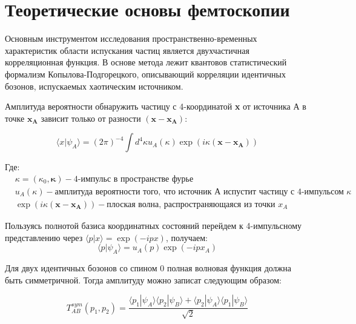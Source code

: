 \documentclass{extarticle}
\begin{document}
\section{Теоретические основы фемтоскопии}
    Основным инструментом исследования пространственно-временных характеристик 
    области испускания частиц является двухчастичная корреляционная функция. 
    В основе метода лежит квантовов статистический формализм Копылова-Подгорецкого, 
    описывающий корреляции идентичных бозонов, испускаемых хаотическим источником.

    Амплитуда вероятности обнаружить частицу с 4-координатой \textbf{x} от источника А 
    в точке $\mathbf{x_{A}}$ зависит только от разности $(\mathbf{x} - \mathbf{x_{A}})$:

    \begin{equation}
        \langle x|\psi_{A}\rangle =
            {(2\pi)}^{-4}
            \int 
                d^4\kappa u_{A}(\kappa) 
                \exp(i\kappa(\mathbf{x} - \mathbf{x_{A}})) 
    \end{equation}

    Где:
    \begin{align*}
        &\kappa = (\kappa_0, \mathbf{\kappa}) 
            - \text{4-импульс в пространстве фурье} \\
        &u_{A}(\kappa) 
            - \text{амплитуда вероятности того, что источник А испустит частицу с 4-импульсом }\kappa \\
        &\exp(i\kappa(\mathbf{x} - \mathbf{x_{A}})) 
            - \text{плоская волна, распространяющаяся из точки } x_A
    \end{align*}

    Пользуясь полнотой базиса координатных состояний перейдем 
    к 4-импульсному представлению через $\langle p|x\rangle = \exp(-ipx)$, получаем:
    \begin{equation}
        \langle p | \psi_{A}\rangle = 
            u_{A}(p) \exp(-ipx_{A})
    \end{equation}

    Для двух идентичных бозонов со спином 0 
    полная волновая функция должна быть симметричной. 
    Тогда амплитуду можно записат следующим образом:

    \begin{equation}
        T^{sym}_{AB} (p_{1}, p_{2}) = 
        \frac{
            \langle p_{1} | \psi_{A}\rangle
            \langle p_{2} | \psi_{B}\rangle + 
            \langle p_{2} | \psi_{A}\rangle 
            \langle p_{1} | \psi_{B}\rangle
        }{ 
            \sqrt{2}
        }
    \end{equation}
\end{document}
